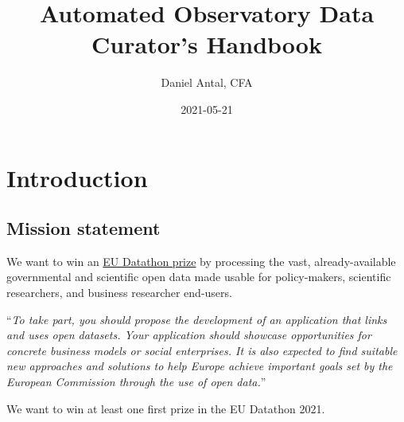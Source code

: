 \documentclass[
  a4paper,
  openany, a4paper, oneside]{book}
\title{Automated Observatory Data Curator's Handbook}
\author{Daniel Antal, CFA}
\date{2021-05-21}
\begin{document}
\maketitle

{
\hypersetup{linkcolor=}
\setcounter{tocdepth}{1}
\tableofcontents
}
\listoffigures
{}
\hypertarget{introduction}{%
\chapter*{Introduction}\label{introduction}}

\hypertarget{mission-statement}{%
\section*{Mission statement}\label{mission-statement}}

We want to win an \href{https://op.europa.eu/en/web/eudatathon}{EU Datathon prize} by processing the vast, already-available governmental and scientific open data made usable for policy-makers, scientific researchers, and business researcher end-users.

``\emph{To take part, you should propose the development of an application that links and uses open datasets. Your application should showcase opportunities for concrete business models or social enterprises. It is also expected to find suitable new approaches and solutions to help Europe achieve important goals set by the European Commission through the use of open data.}''

We want to win at least one first prize in the EU Datathon 2021.
\end{document}
